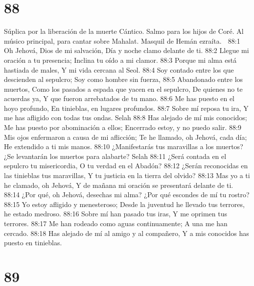 \chapter{88}

Súplica por la liberación de la muerte 
Cántico. Salmo para los hijos de Coré. Al músico principal, para cantar sobre Mahalat. Masquil de Hemán ezraíta. 

88:1 Oh Jehová, Dios de mi salvación, 
Día y noche clamo delante de ti. 
88:2 Llegue mi oración a tu presencia; 
Inclina tu oído a mi clamor. 
88:3 Porque mi alma está hastiada de males, 
Y mi vida cercana al Seol. 
88:4 Soy contado entre los que descienden al sepulcro; 
Soy como hombre sin fuerza, 
88:5 Abandonado entre los muertos, 
Como los pasados a espada que yacen en el sepulcro, 
De quienes no te acuerdas ya, 
Y que fueron arrebatados de tu mano. 
88:6 Me has puesto en el hoyo profundo, 
En tinieblas, en lugares profundos. 
88:7 Sobre mí reposa tu ira, 
Y me has afligido con todas tus ondas. Selah 
88:8 Has alejado de mí mis conocidos; 
Me has puesto por abominación a ellos; 
Encerrado estoy, y no puedo salir. 
88:9 Mis ojos enfermaron a causa de mi aflicción; 
Te he llamado, oh Jehová, cada día; 
He extendido a ti mis manos. 
88:10 ¿Manifestarás tus maravillas a los muertos? 
¿Se levantarán los muertos para alabarte? Selah 
88:11 ¿Será contada en el sepulcro tu misericordia, 
O tu verdad en el Abadón? 
88:12 ¿Serán reconocidas en las tinieblas tus maravillas, 
Y tu justicia en la tierra del olvido? 
88:13 Mas yo a ti he clamado, oh Jehová, 
Y de mañana mi oración se presentará delante de ti. 
88:14 ¿Por qué, oh Jehová, desechas mi alma? 
¿Por qué escondes de mí tu rostro? 
88:15 Yo estoy afligido y menesteroso; 
Desde la juventud he llevado tus terrores, he estado medroso. 
88:16 Sobre mí han pasado tus iras, 
Y me oprimen tus terrores. 
88:17 Me han rodeado como aguas continuamente; 
A una me han cercado. 
88:18 Has alejado de mí al amigo y al compañero, 
Y a mis conocidos has puesto en tinieblas. 

\chapter{89}

